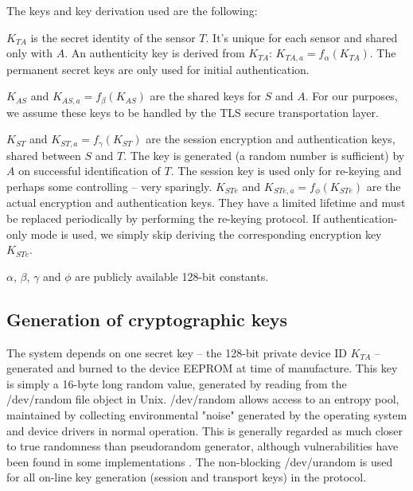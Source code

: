 
The keys and key derivation used are the following:
%
\begin{description}
\item $K_{TA}$ is the secret identity of the sensor $T$. It's unique for each sensor and shared only with $A$. An authenticity key is derived from $K_{TA}$: $K_{TA,a} = f_\alpha(K_{TA})$. The permanent secret keys are only used for initial authentication.
\item $K_{AS}$ and $K_{AS,a}=f_\beta(K_{AS})$ are the shared keys for $S$ and $A$. For our purposes, we assume these keys to be handled by the TLS secure transportation layer.
\item $K_{ST}$ and $K_{ST,a}=f_\gamma(K_{ST})$ are the session encryption and authentication keys, shared between $S$ and $T$. The key is generated (a random number is sufficient) by $A$ on successful identification of $T$. The session key is used only for re-keying and perhaps some controlling -- very sparingly.
$K_{STe}$ and $K_{STe,a}=f_\phi(K_{STe})$ are the actual encryption and authentication keys. They have a limited lifetime and must be replaced periodically by performing the re-keying protocol. If authentication-only mode is used, we simply skip deriving the corresponding encryption key $K_{STe}$.
\end{description}
$\alpha$, $\beta$, $\gamma$ and $\phi$ are publicly available 128-bit constants.

\subsection{Generation of cryptographic keys}

The system depends on one secret key -- the 128-bit private device ID $K_{TA}$ -- generated and burned to the device EEPROM at time of manufacture. This key is simply a 16-byte long random value, generated by reading from the /dev/random file object in Unix. /dev/random allows access to an entropy pool, maintained by collecting environmental "noise" generated by the operating system and device drivers in normal operation. This is generally regarded as much closer to true randomness than pseudorandom generator, although vulnerabilities have been found in some implementations . The non-blocking /dev/urandom is used for all on-line key generation (session and transport keys) in the protocol.

